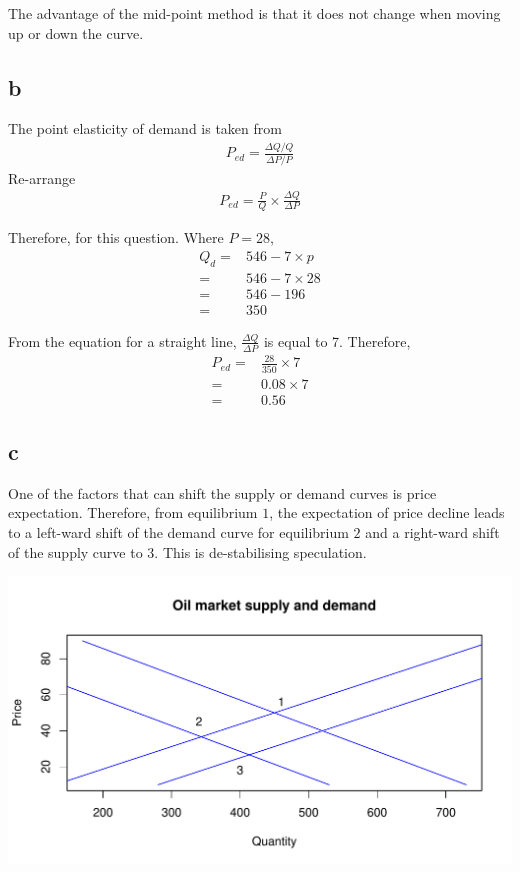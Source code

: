 \documentclass[12pt, a4paper, oneside]{article}\usepackage{graphicx, color}
\makeatletter
\def\maxwidth{ %
  \ifdim\Gin@nat@width>\linewidth
    \linewidth
  \else
    \Gin@nat@width
  \fi
}
\newenvironment{knitrout}{}{} %
\makeatother
\begin{document}
The advantage of the mid-point method is that it does not change when moving up or down the curve.  

\subsection*{b}
The point elasticity of demand is taken from  
\begin{align*}
P_{ed} = \frac{\Delta Q/Q}{\Delta P /P}
\end{align*}
Re-arrange
\begin{align*}
P_{ed} = \frac{P}{Q} \times \frac{\Delta Q}{\Delta P}
\end{align*}

Therefore, for this question. Where $P = 28$, 
\begin{align*}
Q_d =& 546 - 7 \times p\\
 =& 546 - 7 \times 28\\
=& 546 - 196\\
=& 350
\end{align*}


From the equation for a straight line, $\frac{\Delta Q}{\Delta P}$ is equal to 7. 
Therefore, 
\begin{align*}
P_{ed} =& \frac{28}{350} \times 7\\
=& 0.08 \times 7\\
=& 0.56
\end{align*}


\subsection*{c}
One of the factors that can shift the supply or demand curves is price expectation. Therefore, from equilibrium $1$, the expectation of price decline leads to a left-ward shift of the demand curve for equilibrium $2$ and a right-ward shift of the supply curve to $3$.  This is de-stabilising speculation.

\begin{knitrout}
\color{fgcolor}
\includegraphics[width=\maxwidth]{figure/speculation} 

\end{knitrout}
\end{document}
